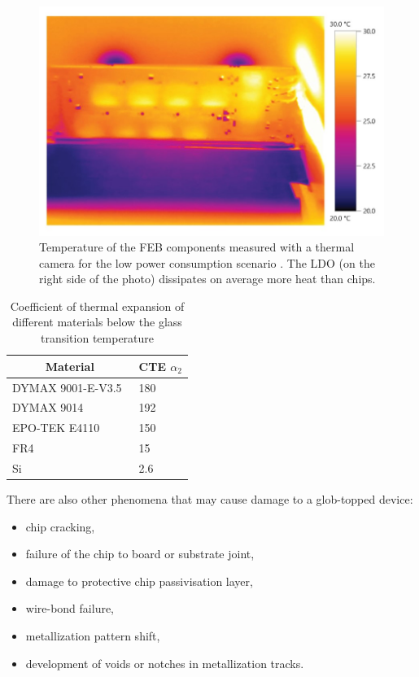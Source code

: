 \begin{figure}[!h]
\centering
\includegraphics[width=0.6\columnwidth]{Chapter4/images/feb_thermal.jpg}
\caption{Temperature of the \gls{FEB} components measured with a thermal camera for the low power consumption scenario \cite{leo_electronics}. The \gls{LDO} (on the right side of the photo) dissipates on average more heat than chips.}
\label{fig_temperatures_camera}
\end{figure}


\begin{table}[!h]
\begin{center}
\caption{Coefficient of thermal expansion of different materials below the glass transition temperature}
\begin{tabular}{ll}
\hline
\multicolumn{1}{c}{Material} & \multicolumn{1}{c}{CTE $\alpha_{2}$} [\si{\micro\metre\per\metre\per\celsius]}] \\ \hline
DYMAX 9001-E-V3.5~\cite{9001}            & 180                                  \\
DYMAX 9014~\cite{9014}                   & 192                                  \\
EPO-TEK E4110~\cite{4110}                & 150                                  \\ \hline
FR4~\cite{FR4}                          & 15                                   \\
Si~\cite{Si}                           & 2.6                                 
\end{tabular}
\label{TCE}
\end{center}
\end{table}

\newpage


There are also other phenomena that may cause damage to a glob-topped device:
\begin{itemize}
    \item chip cracking,
    \item failure of the chip to board or substrate joint,
    \item damage to protective chip passivisation layer,
    \item wire-bond failure,
    \item metallization pattern shift,
    \item development of voids or notches in metallization tracks. 
\end{itemize}


